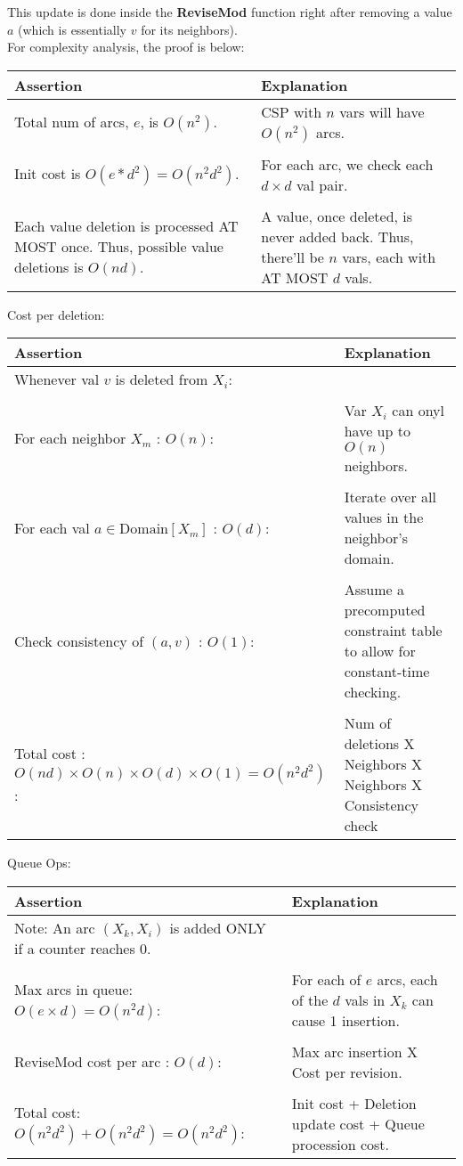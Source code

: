 \documentclass[11pt]{article}
\newenvironment{answercols}
  {\begin{center}\begin{tabular}{p{0.45\textwidth}p{0.45\textwidth}}
   \toprule
   \textbf{Assertion} & \textbf{Explanation} \\
   \midrule}
  {\\ \bottomrule\end{tabular}\end{center}}
\begin{document}
    \noindent This update is done inside the \textbf{ReviseMod} function right after removing a value $a$ (which is essentially $v$ for its neighbors). \\
    For complexity analysis, the proof is below: \\

    \begin{answercols}
        Total num of arcs, $e$, is $O(n^2)$. &
        CSP with $n$ vars will have $O(n^2)$ arcs. \\
        \\
        Init cost is $O(e * d^2) = O(n^2 d^2)$. &
        For each arc, we check each $d \times d$ val pair. \\
        \\
        Each value deletion is processed AT MOST once. Thus, possible value deletions is $O(nd)$. &
        A value, once deleted, is never added back. Thus, there'll be $n$ vars, each with AT MOST $d$ vals.
    \end{answercols}

    Cost per deletion: 

    \begin{answercols}
        Whenever val $v$ is deleted from $X_i$: \\
        \\
        For each neighbor $X_m$ : $O(n)$: &
        Var $X_i$ can onyl have up to $O(n)$ neighbors. \\
        \\
        For each val $a \in \text{Domain}[X_m]$ : $O(d)$: &
        Iterate over all values in the neighbor's domain. \\
        \\
        Check consistency of $(a,v)$ : $O(1)$: &
        Assume a precomputed constraint table to allow for constant-time checking. \\
        \\
        Total cost : $O(nd) \times O(n) \times O(d) \times O(1) = O(n^2 d^2)$: &
        Num of deletions X Neighbors X Neighbors X Consistency check
    \end{answercols}

    Queue Ops:

    \begin{answercols}
        Note: An arc $(X_k, X_i)$ is added ONLY if a counter reaches 0. \\
        \\
        Max arcs in queue: $O(e \times d) = O(n^2 d)$: &
        For each of $e$ arcs, each of the $d$ vals in $X_k$ can cause 1 insertion. \\
        \\
        $\text{ReviseMod}$ cost per arc : $O(d)$: &
        Max arc insertion X Cost per revision. \\
        \\
        Total cost: $O(n^2 d^2) + O(n^2 d^2) = O(n^2 d^2)$: &
        Init cost + Deletion update cost + Queue procession cost.
    \end{answercols}
\end{document}
